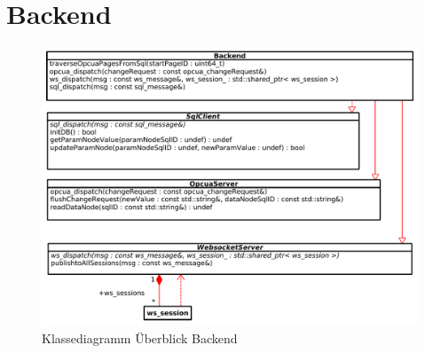 \section{Backend}\label{sec:poc:backend}
\begin{figure}[ht]
  \centering
  \includegraphics[width=\textwidth]{content/hauptteil/umsetzungPoC/backend/uml/overview.pdf}
  \caption{Klassediagramm Überblick Backend}
  \label{fig:backend:classDiag:overview}
\end{figure}


